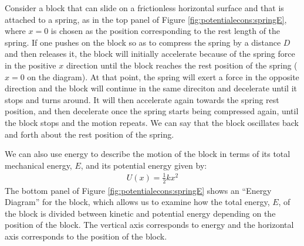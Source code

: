 Consider a block that can slide on a frictionless horizontal surface and that is attached to a spring, as in the top panel of Figure \ref{fig:potentialecons:springE}, where $x=0$ is chosen as the position corresponding to the rest length of the spring. If one pushes on the block so as to compress the spring by a distance $D$ and then releases it, the block will initially accelerate because of the spring force in the positive $x$ direction until the block reaches the rest position of the spring ($x=0$ on the diagram). At that point, the spring will exert a force in the opposite direction and the block will continue in the same direciton and decelerate until it stops and turns around. It will then accelerate again towards the spring rest position, and then decelerate once the spring starts being compressed again, until the block stops and the motion repeats. We can say that the block oscillates back and forth about the rest position of the spring.

We can also use energy to describe the motion of the block in terms of its total mechanical energy, $E$, and its potential energy given by:
\begin{align*}
U(x)=\frac{1}{2}kx^2
\end{align*}
The bottom panel of Figure \ref{fig:potentialecons:springE} shows an ``Energy Diagram'' for the block, which allows us to examine how the total energy, $E$, of the block is divided between kinetic and potential energy depending on the position of the block. The vertical axis corresponds to energy and the horizontal axis corresponds to the position of the block. 


